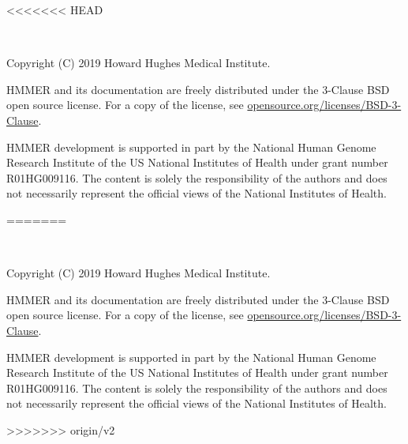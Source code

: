 <<<<<<< HEAD
\newpage
\begin{fullwidth}
  ~\vfill
  \thispagestyle{empty}
  \setlength{\parindent}{0pt}
  \setlength{\parskip}{\baselineskip}

\par
Copyright (C) 2019 Howard Hughes Medical Institute.

\par
HMMER and its documentation are freely distributed
under the 3-Clause BSD open source license. For a copy of the license,
see \href{https://opensource.org/licenses/BSD-3-Clause}{opensource.org/licenses/BSD-3-Clause}.

\par
HMMER development is supported in part by the National Human
Genome Research Institute of the US National Institutes of Health under
grant number R01HG009116. The content is solely the responsibility
of the authors and does not necessarily represent the official views of
the National Institutes of Health.

\end{fullwidth}




=======
\newpage
\begin{fullwidth}
  ~\vfill
  \thispagestyle{empty}
  \setlength{\parindent}{0pt}
  \setlength{\parskip}{\baselineskip}

\par
Copyright (C) 2019 Howard Hughes Medical Institute.

\par
HMMER and its documentation are freely distributed
under the 3-Clause BSD open source license. For a copy of the license,
see \href{https://opensource.org/licenses/BSD-3-Clause}{opensource.org/licenses/BSD-3-Clause}.

\par
HMMER development is supported in part by the National Human
Genome Research Institute of the US National Institutes of Health under
grant number R01HG009116. The content is solely the responsibility
of the authors and does not necessarily represent the official views of
the National Institutes of Health.

\end{fullwidth}




>>>>>>> origin/v2
